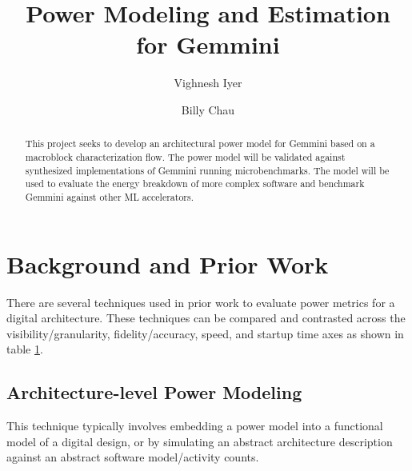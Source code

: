 \documentclass[sigconf]{acmart}
\begin{document}
\title{Power Modeling and Estimation for Gemmini}

\author{Vighnesh Iyer}

\author{Billy Chau}


\begin{abstract}
  This project seeks to develop an architectural power model for Gemmini based on a macroblock characterization flow.
  The power model will be validated against synthesized implementations of Gemmini running microbenchmarks.
  The model will be used to evaluate the energy breakdown of more complex software and benchmark Gemmini against other ML accelerators.
\end{abstract}

\maketitle

\section{Background and Prior Work}
There are several techniques used in prior work to evaluate power metrics for a digital architecture.
These techniques can be compared and contrasted across the visibility/granularity, fidelity/accuracy, speed, and startup time axes as shown in table \ref{}.

\subsection{Architecture-level Power Modeling}\label{arch_modeling}
This technique typically involves embedding a power model into a functional model of a digital design, or by simulating an abstract architecture description against an abstract software model/activity counts.
\end{document}
